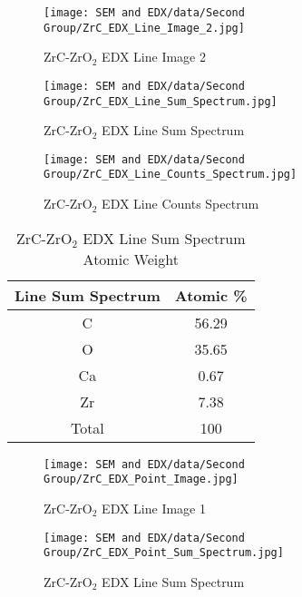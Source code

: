 \documentclass[11pt]{article}
\begin{document}
	\begin{figure}[!ht]
		\centering
		\texttt{[image: SEM and EDX/data/Second Group/ZrC\_EDX\_Line\_Image\_2.jpg]}
		\caption{ZrC-ZrO$_2$ EDX Line Image 2}
		\label{fig:ZrC_EDX_Line_Image_2}
	\end{figure}
	
	\begin{figure}[!ht]
		\centering
		\texttt{[image: SEM and EDX/data/Second Group/ZrC\_EDX\_Line\_Sum\_Spectrum.jpg]}
		\caption{ZrC-ZrO$_2$ EDX Line Sum Spectrum}
		\label{fig:ZrC_EDX_Line_Sum_Spectrum}
	\end{figure}
	
	\begin{figure}[!ht]
		\centering
		\texttt{[image: SEM and EDX/data/Second Group/ZrC\_EDX\_Line\_Counts\_Spectrum.jpg]}
		\caption{ZrC-ZrO$_2$ EDX Line Counts Spectrum}
		\label{fig:ZrC_EDX_Line_Counts_Spectrum}
	\end{figure}
	
	\begin{table}[!ht]
		\centering
		\caption{ZrC-ZrO$_2$ EDX Line Sum Spectrum Atomic Weight}
		\begin{tabular}{cc}
			\toprule
			Line Sum Spectrum & Atomic \% \\
			\midrule
			C & 56.29 \\
			O & 35.65 \\
			Ca & 0.67 \\
			Zr & 7.38 \\
			\midrule
			Total & 100 \\
			\bottomrule
		\end{tabular}%
		\label{tab:ZrC_EDX_Line_Atomic_Weight}%
	\end{table}%
	
	\begin{figure}[!ht]
		\centering
		\texttt{[image: SEM and EDX/data/Second Group/ZrC\_EDX\_Point\_Image.jpg]}
		\caption{ZrC-ZrO$_2$ EDX Line Image 1}
		\label{fig:ZrC_EDX_Point_Image}
	\end{figure}
	
	\begin{figure}[!ht]
		\centering
		\texttt{[image: SEM and EDX/data/Second Group/ZrC\_EDX\_Point\_Sum\_Spectrum.jpg]}
		\caption{ZrC-ZrO$_2$ EDX Line Sum Spectrum}
		\label{fig:ZrC_EDX_Point_Sum_Spectrum}
	\end{figure}
	
\end{document}

